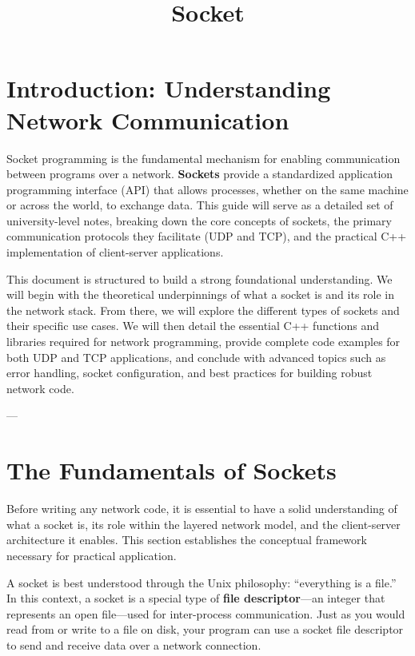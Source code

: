 \documentclass{article}
\title{Socket}
\begin{document}
\maketitle
\newpage
\tableofcontents
\newpage

\section{Introduction: Understanding Network Communication}

Socket programming is the fundamental mechanism for enabling communication between programs over a network. \textbf{Sockets} provide a standardized application programming interface (API) that allows processes, whether on the same machine or across the world, to exchange data. This guide will serve as a detailed set of university-level notes, breaking down the core concepts of sockets, the primary communication protocols they facilitate (UDP and TCP), and the practical C++ implementation of client-server applications.

This document is structured to build a strong foundational understanding. We will begin with the theoretical underpinnings of what a socket is and its role in the network stack. From there, we will explore the different types of sockets and their specific use cases. We will then detail the essential C++ functions and libraries required for network programming, provide complete code examples for both UDP and TCP applications, and conclude with advanced topics such as error handling, socket configuration, and best practices for building robust network code.

---

\section[The Fundamentals of Sockets]{The Fundamentals of Sockets}

Before writing any network code, it is essential to have a solid understanding of what a socket is, its role within the layered network model, and the client-server architecture it enables. This section establishes the conceptual framework necessary for practical application.

A socket is best understood through the Unix philosophy: ``everything is a file.'' In this context, a socket is a special type of \textbf{file descriptor}---an integer that represents an open file---used for inter-process communication. Just as you would read from or write to a file on disk, your program can use a socket file descriptor to send and receive data over a network connection.
\end{document}
